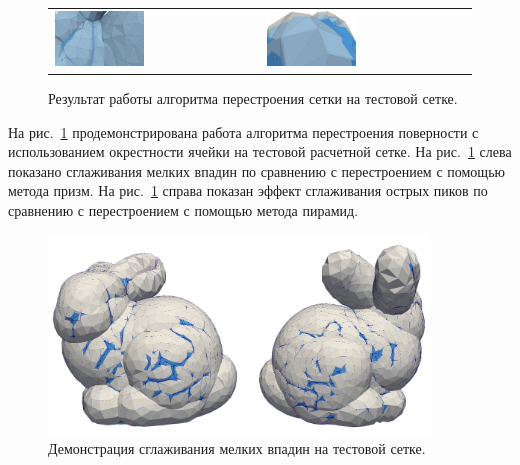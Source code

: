 \begin{figure}[ht]
\centering
\begin{tabular}{ll}
\includegraphics[width=0.45\textwidth]{./pics/text_1_remesh_common_envelope/pic_envelope_cave.png}
&
\includegraphics[width=0.45\textwidth]{./pics/text_1_remesh_common_envelope/pic_envelope_peak.png}
\end{tabular}
\singlespacing
{}\caption{Результат работы алгоритма перестроения сетки на тестовой сетке.}
\label{fig:text_1_remesh3_common_envelope_bunny}
\end{figure}

На рис.~\ref{fig:text_1_remesh3_common_envelope_bunny} продемонстрирована работа алгоритма перестроения поверности с использованием окрестности ячейки на тестовой расчетной сетке.
На рис.~\ref{fig:text_1_remesh3_common_envelope_bunny} слева показано сглаживания мелких впадин по сравнению с перестроением с помощью метода призм.
На рис.~\ref{fig:text_1_remesh3_common_envelope_bunny} справа показан эффект сглаживания острых пиков по сравнению с перестроением с помощью метода пирамид\label{term:method_remesh_pyramid2}.

\begin{figure}[ht]
\centering
\includegraphics[width=0.9\textwidth]{./pics/text_1_remesh_common_envelope/bunny.png}
\singlespacing
{}\caption{Демонстрация сглаживания мелких впадин на тестовой сетке.}
\label{fig:text_1_remesh3_common_envelope_bunny2}
\end{figure}

